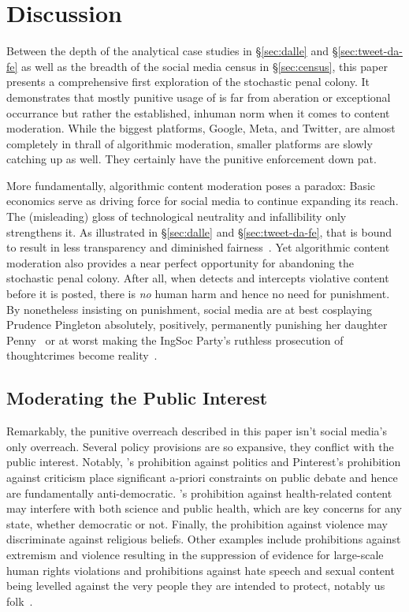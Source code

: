 \section{Discussion}
\label{sec:discussion}

Between the depth of the analytical case studies in \S\ref{sec:dalle} and
\S\ref{sec:tweet-da-fe} as well as the breadth of the social media census in
\S\ref{sec:census}, this paper presents a comprehensive first exploration of the
stochastic penal colony. It demonstrates that mostly punitive usage of  is
far from aberation or exceptional occurrance but rather the established, inhuman
norm when it comes to content moderation. While the biggest platforms, Google,
Meta, and Twitter, are almost completely in thrall of algorithmic moderation,
smaller platforms are slowly catching up as well. They certainly have the
punitive enforcement down pat.

More fundamentally, algorithmic content moderation poses a paradox: Basic
economics serve as driving force for social media to continue expanding its
reach. The (misleading) gloss of technological neutrality and infallibility only
strengthens it. As illustrated in \S\ref{sec:dalle} and \S\ref{sec:tweet-da-fe},
that is bound to result in less transparency and diminished
fairness~\cite{GorwaBinnsea2020}. Yet algorithmic content moderation also
provides a near perfect opportunity for abandoning the stochastic penal colony.
After all, when  detects and intercepts violative content before it is
posted, there is \emph{no} human harm and hence no need for punishment. By
nonetheless insisting on punishment, social media are at best cosplaying
Prudence Pingleton absolutely, positively, permanently punishing her daughter
Penny~\cite{Waters1988} or at worst making the IngSoc Party's ruthless
prosecution of thoughtcrimes become reality~\cite{Orwell1949}.


\subsection{Moderating the Public Interest}

Remarkably, the punitive overreach described in this paper isn't social media's
only overreach. Several policy provisions are so expansive, they conflict with
the public interest. Notably, \DALLE's prohibition against politics and
Pinterest's prohibition against criticism place significant a-priori constraints
on public debate and hence are fundamentally anti-democratic. \DALLE's
prohibition against health-related content may interfere with both science and
public health, which are key concerns for any state, whether democratic or not.
Finally, the prohibition against violence may discriminate against religious
beliefs. Other examples include prohibitions against extremism and violence
resulting in the suppression of evidence for large-scale human rights violations
and prohibitions against hate speech and sexual content being levelled against
the very people they are intended to protect, notably us 
folk~\cite{EidelmanLeeea2021,RahmanAlJaloudAlKhatibea2019,Wille2020}.


